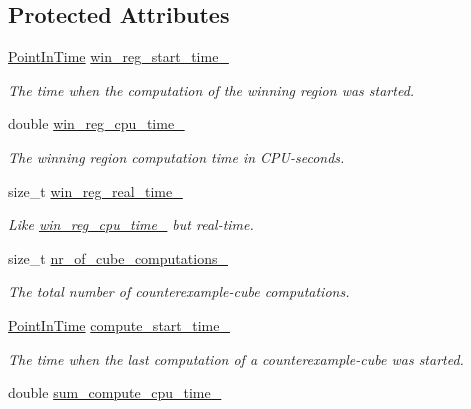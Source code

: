 \subsection*{Protected Attributes}
\begin{DoxyCompactItemize}
\item 
\hyperlink{Stopwatch_8h_af3a9f634f27bed7e98dbc23e5c6f807d}{Point\-In\-Time} \hyperlink{classLearnStatisticsQBF_a2c1d2ca27ab1a5edf496ffd603ba0878}{win\-\_\-reg\-\_\-start\-\_\-time\-\_\-}
\begin{DoxyCompactList}\small\item\em The time when the computation of the winning region was started. \end{DoxyCompactList}\item 
double \hyperlink{classLearnStatisticsQBF_a679a221c1cbf3330572f93d850976289}{win\-\_\-reg\-\_\-cpu\-\_\-time\-\_\-}
\begin{DoxyCompactList}\small\item\em The winning region computation time in C\-P\-U-\/seconds. \end{DoxyCompactList}\item 
size\-\_\-t \hyperlink{classLearnStatisticsQBF_a58013212d789d3c025b521cd150dc12d}{win\-\_\-reg\-\_\-real\-\_\-time\-\_\-}
\begin{DoxyCompactList}\small\item\em Like \hyperlink{classLearnStatisticsQBF_a679a221c1cbf3330572f93d850976289}{win\-\_\-reg\-\_\-cpu\-\_\-time\-\_\-} but real-\/time. \end{DoxyCompactList}\item 
size\-\_\-t \hyperlink{classLearnStatisticsQBF_a857dac1670c551b3dcf935860651143b}{nr\-\_\-of\-\_\-cube\-\_\-computations\-\_\-}
\begin{DoxyCompactList}\small\item\em The total number of counterexample-\/cube computations. \end{DoxyCompactList}\item 
\hyperlink{Stopwatch_8h_af3a9f634f27bed7e98dbc23e5c6f807d}{Point\-In\-Time} \hyperlink{classLearnStatisticsQBF_a820d051dbab21cb8df1ad673b04a0c92}{compute\-\_\-start\-\_\-time\-\_\-}
\begin{DoxyCompactList}\small\item\em The time when the last computation of a counterexample-\/cube was started. \end{DoxyCompactList}\item 
double \hyperlink{classLearnStatisticsQBF_a4caf75f422eed77570e5592ce35c9bd0}{sum\-\_\-compute\-\_\-cpu\-\_\-time\-\_\-}

\end{DoxyCompactItemize}
